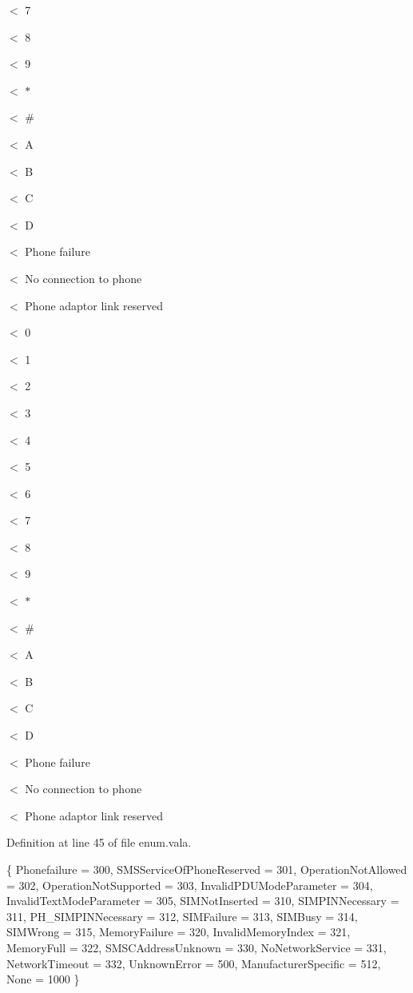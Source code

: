 $<$ 7

$<$ 8

$<$ 9

$<$ $\ast$

$<$ \#

$<$ A

$<$ B

$<$ C

$<$ D

$<$ Phone failure

$<$ No connection to phone

$<$ Phone adaptor link reserved

$<$ 0

$<$ 1

$<$ 2

$<$ 3

$<$ 4

$<$ 5

$<$ 6

$<$ 7

$<$ 8

$<$ 9

$<$ $\ast$

$<$ \#

$<$ A

$<$ B

$<$ C

$<$ D

$<$ Phone failure

$<$ No connection to phone

$<$ Phone adaptor link reserved 

Definition at line 45 of file enum.\-vala.


\begin{DoxyCode}
                                \{
                        Phonefailure  = 300,
                        SMSServiceOfPhoneReserved = 301,
                        OperationNotAllowed = 302,
                        OperationNotSupported = 303,
                        InvalidPDUModeParameter = 304,
                        InvalidTextModeParameter = 305,
                        SIMNotInserted = 310,
                        SIMPINNecessary = 311, 
                        PH\_SIMPINNecessary = 312, 
                        SIMFailure = 313,
                        SIMBusy =  314,
                        SIMWrong = 315,
                        MemoryFailure = 320,
                        InvalidMemoryIndex = 321, 
                        MemoryFull = 322,
                        SMSCAddressUnknown = 330,
                        NoNetworkService = 331, 
                        NetworkTimeout = 332,
                        UnknownError = 500, 
                        ManufacturerSpecific = 512, 
                        None = 1000
                \}
\end{DoxyCode}
